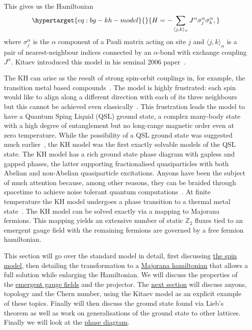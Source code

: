 This gives us the Hamiltonian \begin{equation}\protect\hypertarget{eq:bg-kh-model}{}{ H =  - \sum_{\langle j,k\rangle_\alpha} J^{\alpha}\sigma_j^{\alpha}\sigma_k^{\alpha}, }\label{eq:bg-kh-model}\end{equation} where \(\sigma^\alpha_j\) is the \(\alpha\) component of a Pauli matrix acting on site \(j\) and \(\langle j,k\rangle_\alpha\) is a pair of nearest-neighbour indices connected by an \(\alpha\)-bond with exchange coupling \(J^\alpha\). Kitaev introduced this model in his seminal 2006 paper~\autocite{kitaevAnyonsExactlySolved2006}.

The KH can arise as the result of strong spin-orbit couplings in, for example, the transition metal based compounds~\autocite{Jackeli2009,HerrmannsAnRev2018,Winter2017,TrebstPhysRep2022,Takagi2019}. The model is highly frustrated: each spin would like to align along a different direction with each of its three neighbours but this cannot be achieved even classically~\autocite{chandraClassicalHeisenbergSpins2010,selaOrderbydisorderSpinorbitalLiquids2014}. This frustration leads the model to have a Quantum Sping Liquid (QSL) ground state, a complex many-body state with a high degree of entanglement but no long-range magnetic order even at zero temperature. While the possibility of a QSL ground state was suggested much earlier~\autocite{andersonResonatingValenceBonds1973}, the KH model was the first exactly solvable models of the QSL state. The KH model has a rich ground state phase diagram with gapless and gapped phases, the latter supporting fractionalised quasiparticles with both Abelian and non-Abelian quasiparticle excitations. Anyons have been the subject of much attention because, among other reasons, they can be braided through spacetime to achieve noise tolerant quantum computations~\autocite{freedmanTopologicalQuantumComputation2003}. At finite temperature the KH model undergoes a phase transition to a thermal metal state~\autocite{selfThermallyInducedMetallic2019}. The KH model can be solved exactly via a mapping to Majorana fermions. This mapping yields an extensive number of static \(\mathbb Z_2\) fluxes tied to an emergent gauge field with the remaining fermions are governed by a free fermion hamiltonian.

This section will go over the standard model in detail, first discussing \protect\hyperlink{the-spin-model}{the spin model}, then detailing the transformation to a \protect\hyperlink{the-majorana-model}{Majorana hamiltonian} that allows a full solution while enlarging the Hamiltonian. We will discuss the properties of the \protect\hyperlink{an-emergent-gauge-field}{emergent gauge fields} and the projector. The \protect\hyperlink{sec:anyons}{next section} will discuss anyons, topology and the Chern number, using the Kitaev model as an explicit example of these topics. Finally will then discuss the ground state found via Lieb's theorem as well as work on generalisations of the ground state to other lattices. Finally we will look at the \protect\hyperlink{ground-state-phases}{phase diagram}.

